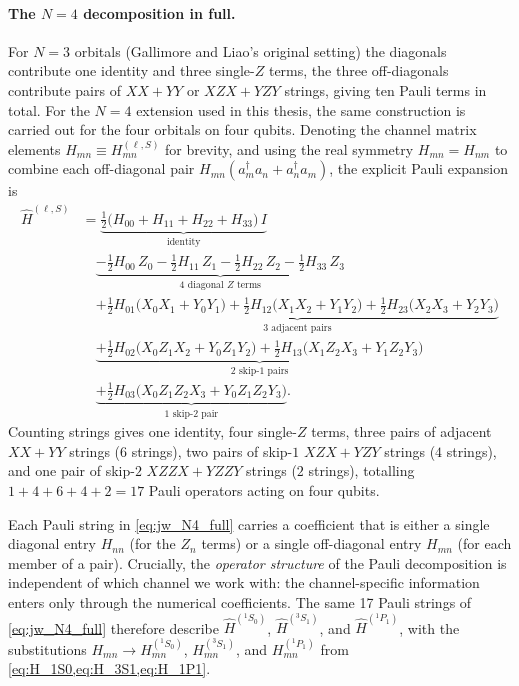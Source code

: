 \paragraph{The $N=4$ decomposition in full.}
For $N=3$ orbitals (Gallimore and Liao's original setting) the diagonals
contribute one identity and three single-$Z$ terms, the three off-diagonals
contribute pairs of $XX{+}YY$ or $XZX{+}YZY$ strings, giving ten Pauli
terms in total. For the $N=4$ extension used in this thesis, the same
construction is carried out for the four orbitals on four qubits. Denoting
the channel matrix elements $H_{mn} \equiv H_{mn}^{(\ell,S)}$ for brevity,
and using the real symmetry $H_{mn}=H_{nm}$ to combine each off-diagonal
pair $H_{mn}(a_m^{\dagger}a_n + a_n^{\dagger}a_m)$, the explicit Pauli
expansion is
\begin{align}
\widehat{H}^{(\ell,S)}
  &= \underbrace{\tfrac{1}{2}\bigl(H_{00}+H_{11}+H_{22}+H_{33}\bigr)\,I}_{\text{identity}}
  \nonumber\\
  &\quad
  \underbrace{-\tfrac{1}{2}H_{00}\,Z_0
    -\tfrac{1}{2}H_{11}\,Z_1
    -\tfrac{1}{2}H_{22}\,Z_2
    -\tfrac{1}{2}H_{33}\,Z_3}_{\text{4 diagonal }Z\text{ terms}}
  \nonumber\\[2pt]
  &\quad
  \underbrace{+\tfrac{1}{2}H_{01}\bigl(X_0 X_1 + Y_0 Y_1\bigr)
    +\tfrac{1}{2}H_{12}\bigl(X_1 X_2 + Y_1 Y_2\bigr)
    +\tfrac{1}{2}H_{23}\bigl(X_2 X_3 + Y_2 Y_3\bigr)}_{\text{3 adjacent pairs}}
  \nonumber\\[2pt]
  &\quad
  \underbrace{+\tfrac{1}{2}H_{02}\bigl(X_0 Z_1 X_2 + Y_0 Z_1 Y_2\bigr)
    +\tfrac{1}{2}H_{13}\bigl(X_1 Z_2 X_3 + Y_1 Z_2 Y_3\bigr)}_{\text{2 skip-1 pairs}}
  \nonumber\\[2pt]
  &\quad
  \underbrace{+\tfrac{1}{2}H_{03}\bigl(X_0 Z_1 Z_2 X_3
                                       + Y_0 Z_1 Z_2 Y_3\bigr)}_{\text{1 skip-2 pair}}.
  \label{eq:jw_N4_full}
\end{align}
Counting strings gives one identity, four single-$Z$ terms, three pairs of
adjacent $XX{+}YY$ strings ($6$ strings), two pairs of skip-$1$
$XZX{+}YZY$ strings ($4$ strings), and one pair of skip-$2$
$XZZX{+}YZZY$ strings ($2$ strings), totalling
$1 + 4 + 6 + 4 + 2 = 17$ Pauli operators acting on four qubits.

\begin{remark}
Each Pauli string in \cref{eq:jw_N4_full} carries a coefficient that is
either a single diagonal entry $H_{nn}$ (for the $Z_n$ terms) or a single
off-diagonal entry $H_{mn}$ (for each member of a pair). Crucially, the
\emph{operator structure} of the Pauli decomposition is independent of which channel we
work with: the channel-specific information enters only through the
numerical coefficients. The same 17 Pauli strings of
\cref{eq:jw_N4_full} therefore describe $\widehat{H}^{({}^1S_0)}$,
$\widehat{H}^{({}^3S_1)}$, and $\widehat{H}^{({}^1P_1)}$, with the
substitutions $H_{mn} \to H_{mn}^{({}^1S_0)}$, $H_{mn}^{({}^3S_1)}$, and
$H_{mn}^{({}^1P_1)}$ from \cref{eq:H_1S0,eq:H_3S1,eq:H_1P1}.
\end{remark}

